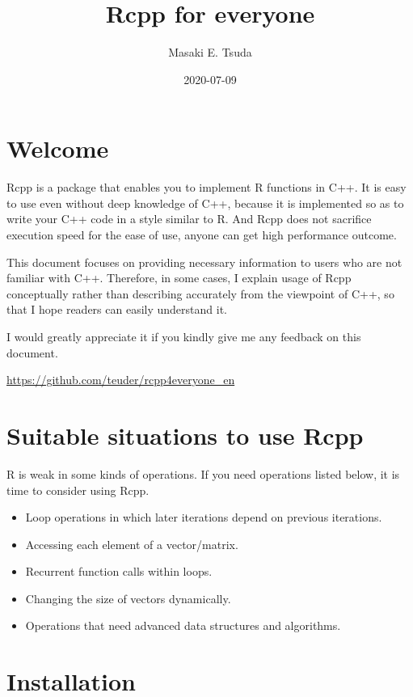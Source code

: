 \documentclass[
]{book}
\title{Rcpp for everyone}
\author{Masaki E. Tsuda}
\date{2020-07-09}
\providecommand{\tightlist}{%
  \setlength{\itemsep}{0pt}\setlength{\parskip}{0pt}}
\begin{document}
\maketitle

{
\setcounter{tocdepth}{1}
\tableofcontents
}
\hypertarget{welcome}{%
\chapter*{Welcome}\label{welcome}}

Rcpp is a package that enables you to implement R functions in C++. It is easy to use even without deep knowledge of C++, because it is implemented so as to write your C++ code in a style similar to R. And Rcpp does not sacrifice execution speed for the ease of use, anyone can get high performance outcome.

This document focuses on providing necessary information to users who are not familiar with C++. Therefore, in some cases, I explain usage of Rcpp conceptually rather than describing accurately from the viewpoint of C++, so that I hope readers can easily understand it.

I would greatly appreciate it if you kindly give me any feedback on this document.

\url{https://github.com/teuder/rcpp4everyone_en}

\hypertarget{suitable-situations-to-use-rcpp}{%
\chapter{Suitable situations to use Rcpp}\label{suitable-situations-to-use-rcpp}}

R is weak in some kinds of operations. If you need operations listed below, it is time to consider using Rcpp.

\begin{itemize}
\tightlist
\item
  Loop operations in which later iterations depend on previous iterations.
\item
  Accessing each element of a vector/matrix.
\item
  Recurrent function calls within loops.
\item
  Changing the size of vectors dynamically.
\item
  Operations that need advanced data structures and algorithms.
\end{itemize}

\hypertarget{installation}{%
\chapter{Installation}\label{installation}}
\end{document}
